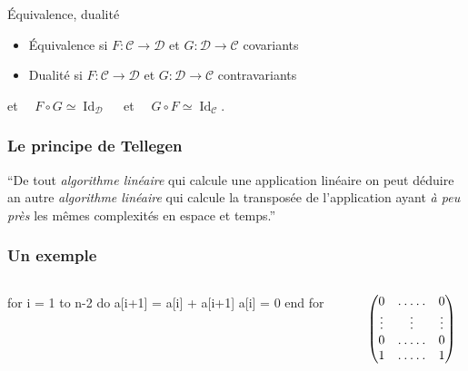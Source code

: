 \documentclass[10pt]{beamer}
\newcommand{\cat}[1]{\mathscr{#1}}
\newcommand{\C}{\cat{C}}
\newcommand{\D}{\cat{D}}
\newcommand{\comp}{\circ}
\DeclareMathOperator{\Id}{Id}
\newcommand{\ra}{\rightarrow}
\begin{document}
\begin{frame}
  \begin{block}{Équivalence, dualité}
    \begin{itemize}
    \item Équivalence si $F:\C\ra\D$ et $G:\D\ra\C$ covariants 
    \item Dualité si $F:\C\ra\D$ et $G:\D\ra\C$ contravariants 
    \end{itemize}
    et $\quad F\comp G \simeq \Id_\D\quad$ et $\quad G\comp F \simeq \Id_\C$.
  \end{block}
  
\end{frame}


\begin{frame}
  \frametitle{Le principe de Tellegen}

  \Large
  \begin{center}
    ``De tout \alert{\emph{algorithme linéaire}} qui calcule une
    application linéaire on peut déduire an autre
    \alert{\emph{algorithme linéaire}} qui calcule la transposée de
    l'application ayant \emph{à peu près} les mêmes complexités en
    espace et temps.''
  \end{center}
\end{frame}


\begin{frame}[fragile]
  \frametitle{Un exemple}

  \begin{columns}

    \begin{column}{0.5\textwidth}
      \begin{center}
        \begin{minipage}{0.7\textwidth}
\begin{semiverbatim}
  for i = 1 to n-2 do
    a[i+1] = a[i] + a[i+1]
    a[i] = 0
  end for
\end{semiverbatim}
        \end{minipage}
      \end{center}
    \end{column}

    \begin{column}{0.5\textwidth}

      \begin{equation*}
        \begin{pmatrix}
          0 & \hdotsfor{3} & 0\\
          \vdots  &  &\vdots&& \vdots \\
          0 & \hdotsfor{3} & 0\\
          1 & \hdotsfor{3} & 1
        \end{pmatrix}
      \end{equation*}

    \end{column}
  \end{columns}
\end{frame}
\end{document}
